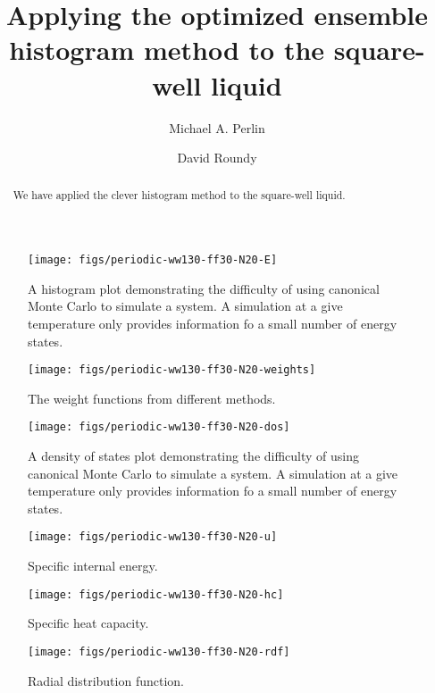 \documentclass[letterpaper,twocolumn,amsmath,amssymb,pre,aps,10pt]{revtex4-1}
\begin{document}
\title{Applying the optimized ensemble histogram method to the square-well liquid}

\author{Michael A. Perlin}
\author{David Roundy}

\begin{abstract}
  We have applied the clever histogram method to the square-well liquid.
\end{abstract}

\maketitle

\begin{figure}
  \texttt{[image: figs/periodic-ww130-ff30-N20-E]}
  \caption{A histogram plot demonstrating the difficulty of using
    canonical Monte Carlo to simulate a system.  A simulation at a
    give temperature only provides information fo a small number of
    energy states.\label{fig:histograms}}
\end{figure}

\begin{figure}
  \texttt{[image: figs/periodic-ww130-ff30-N20-weights]}
  \caption{The weight functions from different methods.}
\end{figure}

\begin{figure}
  \texttt{[image: figs/periodic-ww130-ff30-N20-dos]}
  \caption{A density of states plot demonstrating the difficulty of using
    canonical Monte Carlo to simulate a system.  A simulation at a
    give temperature only provides information fo a small number of
    energy states.\label{fig:dos}}
\end{figure}

\begin{figure}
  \texttt{[image: figs/periodic-ww130-ff30-N20-u]}
  \caption{Specific internal energy.\label{fig:u}}
\end{figure}

\begin{figure}
  \texttt{[image: figs/periodic-ww130-ff30-N20-hc]}
  \caption{Specific heat capacity.\label{fig:hc}}
\end{figure}

\begin{figure}
  \texttt{[image: figs/periodic-ww130-ff30-N20-rdf]}
  \caption{Radial distribution function.\label{fig:rdf}}
\end{figure}
\end{document}
